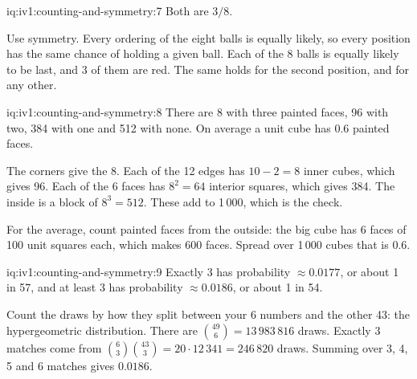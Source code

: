 \begin{solution}{iq:iv1:counting-and-symmetry:7}
Both are $3/8$.

Use symmetry. Every ordering of the eight balls is equally likely, so every position has the same chance of holding a given ball. Each of the 8 balls is equally likely to be last, and 3 of them are red. The same holds for the second position, and for any other.

\end{solution}

\begin{solution}{iq:iv1:counting-and-symmetry:8}
There are 8 with three painted faces, 96 with two, 384 with one and 512 with none. On average a unit cube has $0.6$ painted faces.

The corners give the 8. Each of the 12 edges has $10 - 2 = 8$ inner cubes, which gives 96. Each of the 6 faces has $8^2 = 64$ interior squares, which gives 384. The inside is a block of $8^3 = 512$. These add to 1\,000, which is the check.

For the average, count painted faces from the outside: the big cube has 6 faces of 100 unit squares each, which makes 600 faces. Spread over 1\,000 cubes that is $0.6$.

\end{solution}

\begin{solution}{iq:iv1:counting-and-symmetry:9}
Exactly 3 has probability $\approx 0.0177$, or about 1 in 57, and at least 3 has probability $\approx 0.0186$, or about 1 in 54.

Count the draws by how they split between your 6 numbers and the other 43: the hypergeometric distribution. There are $\binom{49}{6} = 13\,983\,816$ draws. Exactly 3 matches come from $\binom{6}{3}\binom{43}{3} = 20 \cdot 12\,341 = 246\,820$ draws. Summing over 3, 4, 5 and 6 matches gives $0.0186$.

\end{solution}

